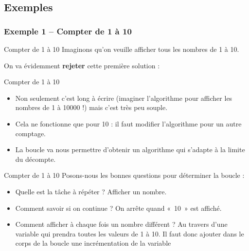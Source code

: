 \subsection{Exemples}

\subsubsection{Exemple 1 -- Compter de 1 à 10}

\begin{frame}{Compter de 1 à 10}
	Imaginons qu'on veuille afficher tous les nombres de 1 à 10. 
	
	On va évidemment \textbf{rejeter} cette première solution :

\end{frame}

\begin{frame}{Compter de 1 à 10}
	\begin{itemize}
	\item
	Non seulement c'est long à écrire 
	(imaginer l'algorithme pour afficher les nombres de 1 à 10000 !) 
	mais c'est très peu souple.
	\item
	Cela ne fonctionne que pour 10 : il faut modifier l'algorithme pour
	un autre comptage.
	\item
	La boucle va nous permettre
	d'obtenir un algorithme qui s'adapte
	à la limite du décompte.
	\end{itemize}
\end{frame}
	
\begin{frame}{Compter de 1 à 10}
	Posons-nous les bonnes questions pour déterminer la boucle :

	\begin{itemize}
	\item 
		Quelle est la tâche à répéter ? Afficher un nombre.
	\item 
		Comment savoir si on continue ? On arrête quand «~10~» est affiché.
	\item 
		Comment afficher à chaque fois un nombre différent ? 
		Au travers d'une variable qui prendra toutes les valeurs de 1 à 10. 
		Il faut donc ajouter dans le corps de la
		boucle une incrémentation de la variable
	\end{itemize}
\end{frame}

